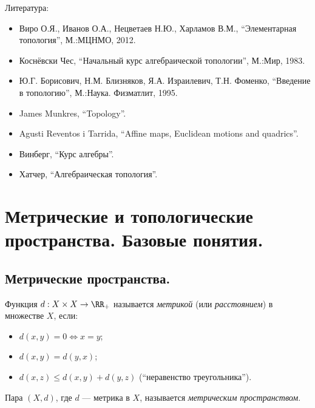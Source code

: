 \documentclass[12pt,a4paper]{article}
\date{}
\begin{document}
    \maketitle

    \listoftodos[TODOs]

    \tableofcontents

    \vspace{2em}

    Литература:
    \begin{itemize}
        \item Виро О.Я., Иванов О.А., Нецветаев Н.Ю., Харламов В.М., ``Элементарная топология'', М.:МЦНМО, 2012.
        \item Коснёвски Чес, ``Начальный курс алгебраической топологии'', М.:Мир, 1983.
        \item Ю.Г. Борисович, Н.М. Близняков, Я.А. Израилевич, Т.Н. Фоменко, ``Введение в топологию'', М.:Наука. Физматлит, 1995.
        \item James Munkres, ``Topology''.
        \item Agusti Reventos i Tarrida, ``Affine maps, Euclidean motions and quadrics''.
        \item Винберг, ``Курс алгебры''.
        \item Хатчер, ``Алгебраическая топология''. 
    \end{itemize}

    \section{Метрические и топологические пространства. Базовые понятия.}
    
    \subsection{Метрические пространства.}

    \begin{definition}
        Функция $d: X \times X \to \RR_+$ называется \emph{метрикой} (или \emph{расстоянием}) в множестве $X$, если:
        \begin{itemize}
            \item $d(x, y) = 0 \Leftrightarrow x = y$;
            \item $d(x, y) = d(y, x)$;
            \item $d(x, z) \leqslant d(x, y) + d(y, z)$ (``неравенство треугольника'').
        \end{itemize}
        Пара $(X, d)$, где $d$ --- метрика в $X$, называется \emph{метрическим пространством}.
    \end{definition}
\end{document}

